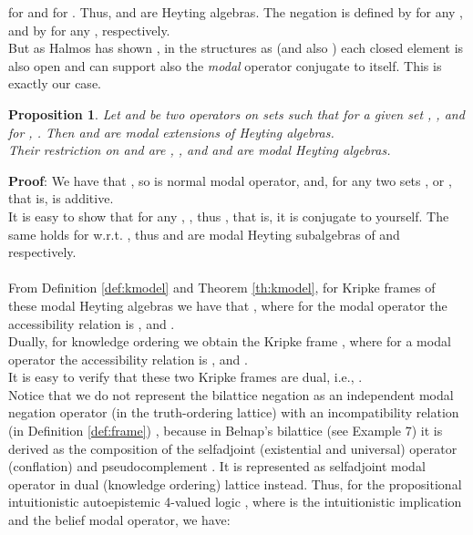 \documentclass[10pt,twocolumn]{article}
\newtheorem{propo}{Proposition}
\begin{document}
 for  and 
 for . Thus,  and  are Heyting
 algebras. The negation is defined by  for any , and by  for any , respectively.\\
 But as Halmos has shown \cite{Halm62}, in the structures as 
 (and also )  each closed element is
 also  open and can support also
 the  \emph{modal} operator  conjugate to itself.
 This is exactly our case.
 \begin{propo}  \label{prop:3} Let  and  be two operators on sets such that for a given
 set , , and  for , .
 Then  and  are modal extensions of Heyting
 algebras.\\ Their restriction on  and  are , ,
 and  and  are modal Heyting
 algebras.
 \end{propo}
 \textbf{Proof}: We have that ,
 so  is normal modal operator, and, for any two sets ,  or , that is,  is additive.\\
 It is easy to show that for any , , thus , that is, it is conjugate to yourself. The same holds for
  w.r.t. , thus  and  are modal Heyting
 subalgebras of  and  respectively.\\
 \\
 From Definition \ref{def:kmodel} and Theorem \ref{th:kmodel},
 for Kripke frames of these modal Heyting algebras we have that , where for the modal operator  the
accessibility relation is , and
.\\
Dually, for knowledge ordering we obtain the Kripke frame , where for a modal operator 
the accessibility relation is , and .\\
It is easy to verify that these two Kripke frames are dual, i.e.,
.\\
Notice that we do not represent the bilattice negation  as an
independent modal negation operator (in the truth-ordering lattice)
with an incompatibility relation (in Definition \ref{def:frame})
, because in Belnap's bilattice (see Example 7) it is
derived as the composition  of the
selfadjoint (existential and universal) operator  (conflation)
and pseudocomplement . It is  represented as selfadjoint
modal operator in dual (knowledge ordering) lattice instead.
 Thus, for the propositional intuitionistic autoepistemic 4-valued logic , where 
 is the intuitionistic implication and  the  belief
 modal operator, we have:
\end{document}
